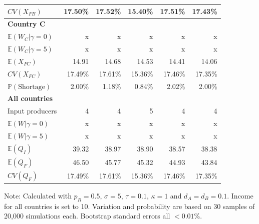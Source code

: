 \documentclass{article}
\begin{document}
\begin{table}
\begin{threeparttable}
\begin{tabular}{lrrrrr}
            $CV(X_{FB})$ & 17.50\% & 17.52\% & 15.40\% & 17.51\% & 17.43\% \\
            \midrule
            \textbf{Country C} \\
            $\mathbb{E}(W_C | \gamma = 0)$ & x & x & x & x & x \\
            $\mathbb{E}(W_C | \gamma = 5)$ & x & x & x & x & x \\            
            $\mathbb{E}(X_{FC})$ & 14.91 & 14.68 & 14.53 & 14.41 & 14.06 \\
            $CV(X_{FC})$ & 17.49\% & 17.61\% & 15.36\% & 17.46\% & 17.35\% \\
            $\mathbb{P}(\text{Shortage})$ & 2.00\% & 1.18\% & 0.84\% & 2.02\% & 2.00\% \\ 
            \midrule
            \textbf{All countries} \\
            Input producers & 4 & 4 & 5 & 4 & 4 \\
            $\mathbb{E}(W | \gamma = 0)$ & x & x & x & x & x \\
            $\mathbb{E}(W | \gamma = 5)$ & x & x & x & x & x \\
            $\mathbb{E}(Q_I)$ & 39.32 & 38.97 & 38.90 & 38.57 & 38.38 \\
            $\mathbb{E}(Q_F)$ & 46.50 & 45.77 & 45.32 & 44.93 & 43.84 \\
            $CV(Q_F)$ & 17.49\% & 17.61\% & 15.36\% & 17.46\% & 17.35\% \\
            \bottomrule
        \end{tabular}
        \begin{tablenotes}
            \small \item Note: Calculated with $p_R = 0.5$, $\sigma = 5$, $\tau = 0.1$, $\kappa = 1$ and $d_A = d_B = 0.1$. Income for all countries is set to 10. Variation and probability are based on 30 samples of 20,000 simulations each. Bootstrap standard errors all $<0.01\%$.
        \end{tablenotes}
    \end{threeparttable}
\end{table}
\end{document}
